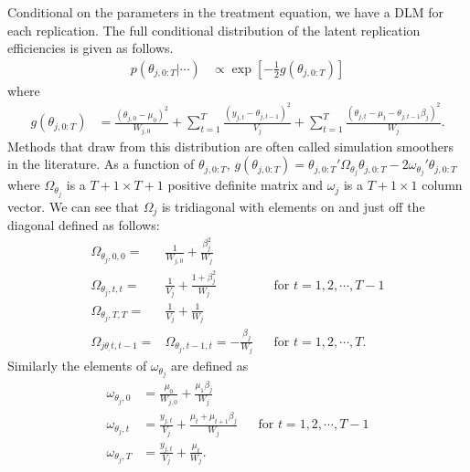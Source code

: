 \documentclass[graybox]{svmult}
\begin{document}
Conditional on the parameters in the treatment equation, we have a DLM for each replication. The full conditional distribution of the latent replication efficiencies is given as follows.
\begin{align*}
p(\theta_{j,0:T}|\cdots)&\propto \exp\left[-\frac{1}{2}g(\theta_{j,0:T})\right]
\end{align*}
where
\begin{align*}
g(\theta_{j,0:T}) &= \frac{(\theta_{j,0} - \mu_0)^2}{W_{j,0}} + \sum_{t=1}^T\frac{(y_{j,t} - \theta_{j,t-1})^2}{V_j} + \sum_{t=1}^T\frac{(\theta_{j,t} - \mu_t - \theta_{j,t-1}\beta_j)^2}{W_j}. 
\end{align*}
Methods that draw from this distribution are often called simulation smoothers in the literature. As a function of $\theta_{j,0:T}$, $g(\theta_{j,0:T}) = \theta_{j,0:T}'\Omega_{\theta_j}\theta_{j,0:T} - 2\omega_{\theta_j}'\theta_{j,0:T}$ where $\Omega_{\theta_j}$ is a $T+1\times T+1$ positive definite matrix and $\omega_j$ is a $T+1\times 1$ column vector. We can see that $\Omega_j$ is tridiagonal with elements on and just off the diagonal defined as follows:
\begin{align*}
\Omega_{\theta_j,0,0}=&\frac{1}{W_{j,0}} + \frac{\beta_j^2}{W_j}&&\\
\Omega_{\theta_j,t,t}=&\frac{1}{V_{j}} + \frac{1 + \beta_j^2}{W_j}&&\mbox{for } t=1,2,\cdots,T-1\\
\Omega_{\theta_j,T,T}=&\frac{1}{V_{j}} + \frac{1}{W_j}&&\\
\Omega_{j\theta_,t,t-1}=&\Omega_{\theta_j,t-1,t}=-\frac{\beta_j}{W_j}&&\mbox{for } t=1,2,\cdots,T.
\end{align*}
Similarly the elements of $\omega_{\theta_j}$ are defined as
\begin{align*}
\omega_{\theta_j,0} &= \frac{\mu_0}{W_{j,0}} + \frac{\mu_1\beta_j}{W_j}&&\\
\omega_{\theta_j,t} &= \frac{y_{j,t}}{V_j} + \frac{\mu_t + \mu_{t+1}\beta_j}{W_j}&&\mbox{for } t=1,2,\cdots,T-1\\
\omega_{\theta_j,T} &= \frac{y_{j,t}}{V_j} + \frac{\mu_t}{W_j}.&&
\end{align*}
\end{document}
